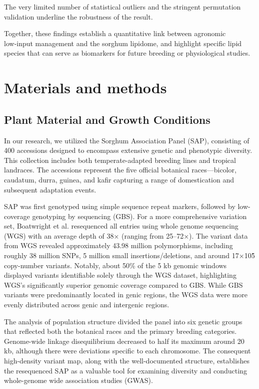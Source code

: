 \documentclass[10pt,letterpaper]{article}
\begin{document}
The very limited number of statistical outliers and the stringent permutation validation underline the robustness of the result.

Together, these findings establish a quantitative link between agronomic low‑input management and the sorghum lipidome, and highlight specific lipid species that can serve as biomarkers for future breeding or physiological studies.

\section*{Materials and methods}

\subsection*{Plant Material and Growth Conditions}
In our research, we utilized the Sorghum Association Panel (SAP), consisting of 400 accessions designed to encompass extensive genetic and phenotypic diversity. This collection includes both temperate-adapted breeding lines and tropical landraces. The accessions represent the five official botanical races—bicolor, caudatum, durra, guinea, and kafir capturing a range of domestication and subsequent adaptation events.

SAP was first genotyped using simple sequence repeat markers, followed by low-coverage genotyping by sequencing (GBS). For a more comprehensive variation set, Boatwright et al. resequenced all entries using whole genome sequencing (WGS) with an average depth of 38× (ranging from 25–72×). The variant data from WGS revealed approximately 43.98 million polymorphisms, including roughly 38 million SNPs, 5 million small insertions/deletions, and around 17×10\^5 copy-number variants. Notably, about 50\% of the 5 kb genomic windows displayed variants identifiable solely through the WGS dataset, highlighting WGS's significantly superior genomic coverage compared to GBS. While GBS variants were predominantly located in genic regions, the WGS data were more evenly distributed across genic and intergenic regions.

The analysis of population structure divided the panel into six genetic groups that reflected both the botanical races and the primary breeding categories. Genome-wide linkage disequilibrium decreased to half its maximum around 20 kb, although there were deviations specific to each chromosome. The consequent high-density variant map, along with the well-documented structure, establishes the resequenced SAP as a valuable tool for examining diversity and conducting whole-genome wide association studies (GWAS).
\end{document}
